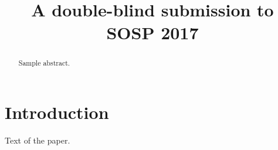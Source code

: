 \documentclass[10pt,preprint]{sigplanconf}
\date{}
\begin{document}
\title{A double-blind submission to SOSP 2017} 
\maketitle

\begin{abstract}

Sample abstract.

\end{abstract}

\section{Introduction}

Text of the paper.


% 
\end{document}

